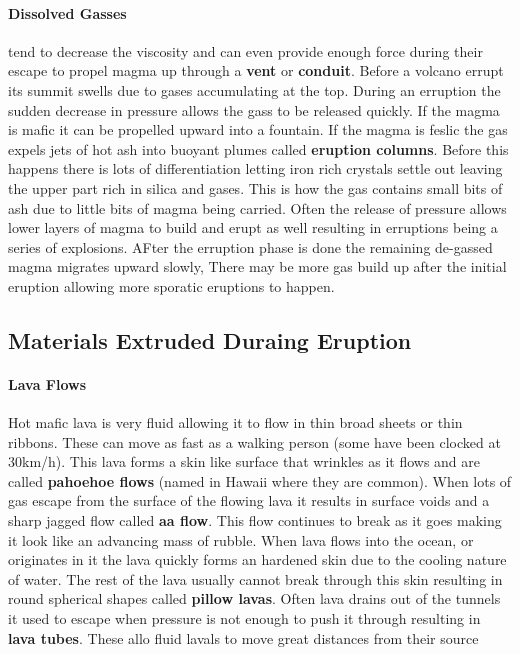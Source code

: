 \documentclass{article}
\begin{document}
\paragraph{Dissolved Gasses} %
\label{par:dissolved_gasses}
tend to decrease the viscosity and can even provide enough force during their escape to propel magma up through a \textbf{vent} or \textbf{conduit}. Before a volcano errupt its summit swells due to gases accumulating at the top. During an erruption the sudden decrease in pressure allows the gass to be released quickly. If the magma is mafic it can be propelled upward into a fountain. If the magma is feslic the gas expels jets of hot ash into buoyant plumes called \textbf{eruption columns}. Before this happens there is lots of differentiation letting iron rich crystals settle out leaving the upper part rich in silica and gases. This is how the gas contains small bits of ash due to little bits of magma being carried. Often the release of pressure allows lower layers of magma to build and erupt as well resulting in erruptions being a series of explosions. AFter the erruption phase is done the remaining de-gassed magma migrates upward slowly, There may be more gas build up after the initial eruption allowing more sporatic eruptions to happen.

\subsection{Materials Extruded Duraing Eruption} %
\label{sub:materials_extruded_duraing_eruption}
\paragraph{Lava Flows} %
\label{par:lava_flows}
Hot mafic lava is very fluid allowing it to flow in thin broad sheets or thin ribbons. These can move as fast as a walking person (some have been clocked at 30km/h). This lava forms a skin like surface that wrinkles as it flows and are called \textbf{pahoehoe flows} (named in Hawaii where they are common). When lots of gas escape from the surface of the flowing lava it results in surface voids and a sharp jagged flow called \textbf{aa flow}. This flow continues to break as it goes making it look like an advancing mass of rubble. When lava flows into the ocean, or originates in it the lava quickly forms an hardened skin due to the cooling nature of water. The rest of the lava usually cannot break through this skin resulting in round spherical shapes called \textbf{pillow lavas}. Often lava drains out of the tunnels it used to escape when pressure is not enough to push it through resulting in \textbf{lava tubes}. These allo fluid lavals to move great distances from their source
\end{document}
